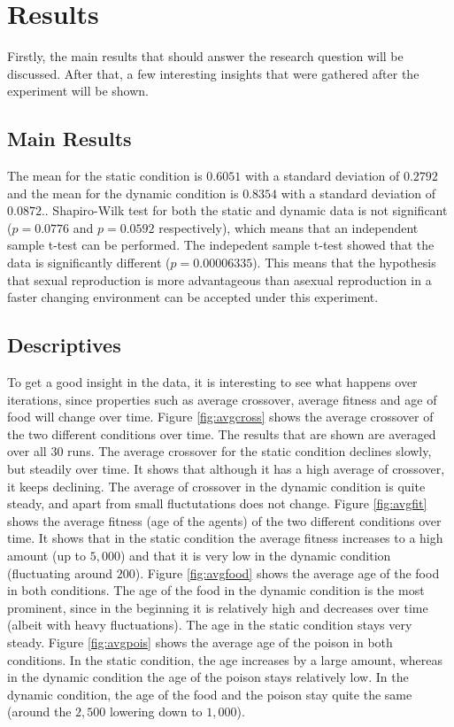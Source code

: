 \section{Results}

Firstly, the main results that should answer the research question will be discussed.
After that, a few interesting insights that were gathered after the experiment will be shown.

\subsection{Main Results}
The mean for the static condition is $0.6051$ with a standard deviation of $0.2792$ and the mean for the dynamic condition is $0.8354$ with a standard deviation of $0.0872$..
Shapiro-Wilk test for both the static and dynamic data is not significant ($p = 0.0776$ and $p = 0.0592$ respectively), which means that an independent sample t-test can be performed. %
The indepedent sample t-test showed that the data is significantly different ($p = 0.00006335$).
This means that the hypothesis that sexual reproduction is more advantageous than asexual reproduction in a faster changing environment can be accepted under this experiment.

\subsection{Descriptives}
To get a good insight in the data, it is interesting to see what happens over iterations, since properties such as average crossover, average fitness and age of food will change over time.
Figure \ref{fig:avgcross} shows the average crossover of the two different conditions over time.
The results that are shown are averaged over all $30$ runs.
The average crossover for the static condition declines slowly, but steadily over time.
It shows that although it has a high average of crossover, it keeps declining.
The average of crossover in the dynamic condition is quite steady, and apart from small fluctutations does not change.
Figure \ref{fig:avgfit} shows the average fitness (age of the agents) of the two different conditions over time.
It shows that in the static condition the average fitness increases to a high amount (up to $5,000$) and that it is very low in the dynamic condition (fluctuating around $200$).
Figure \ref{fig:avgfood} shows the average age of the food in both conditions.
The age of the food in the dynamic condition is the most prominent, since in the beginning it is relatively high and decreases over time (albeit with heavy fluctuations).
The age in the static condition stays very steady.
Figure \ref{fig:avgpois} shows the average age of the poison in both conditions.
In the static condition, the age increases by a large amount, whereas in the dynamic condition the age of the poison stays relatively low.
In the dynamic condition, the age of the food and the poison stay quite the same (around the $2,500$ lowering down to $1,000$).

